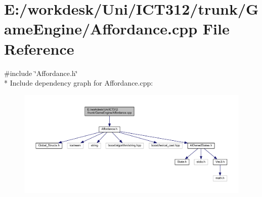 \section{E\+:/workdesk/\+Uni/\+I\+C\+T312/trunk/\+Game\+Engine/\+Affordance.cpp File Reference}
\label{_affordance_8cpp}
{\ttfamily \#include \char`\"{}Affordance.\+h\char`\"{}}\\*
Include dependency graph for Affordance.\+cpp\+:\nopagebreak
\begin{figure}[H]
\begin{center}
\leavevmode
\includegraphics[width=350pt]{d3/d4b/_affordance_8cpp__incl}
\end{center}
\end{figure}
